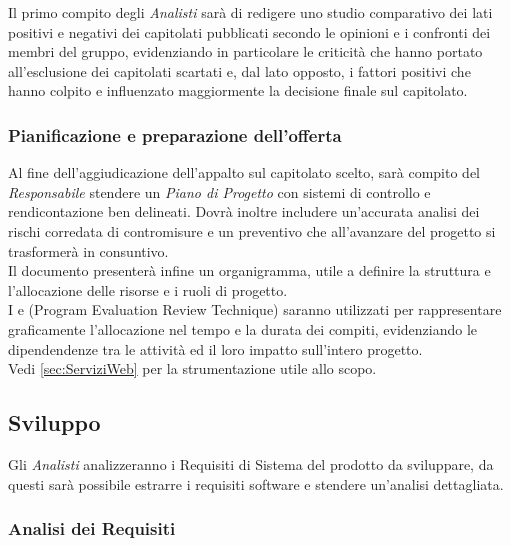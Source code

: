 \documentclass{scalatekids-article}
\begin{document}
Il primo compito degli \textit{Analisti} sarà di redigere uno studio comparativo
dei lati positivi e negativi dei capitolati pubblicati secondo le opinioni e i
confronti dei membri del gruppo, evidenziando in particolare le criticità che
hanno portato all'esclusione dei capitolati scartati e, dal lato opposto, i
fattori positivi che hanno colpito e influenzato maggiormente la decisione
finale sul capitolato.

\subsubsection{Pianificazione e preparazione dell'offerta}

Al fine dell'aggiudicazione dell'appalto sul capitolato scelto, sarà compito del
\textit{Responsabile} stendere un \textit{Piano di Progetto} con sistemi di
controllo e rendicontazione ben delineati. Dovrà inoltre includere un'accurata
analisi dei rischi corredata di contromisure e un preventivo che all'avanzare
del progetto si trasformerà in consuntivo.\\
Il documento presenterà infine un organigramma, utile a definire la struttura
e l'allocazione delle risorse e i ruoli di progetto.\\
I  e  (Program Evaluation Review
Technique) saranno utilizzati per rappresentare graficamente l'allocazione nel
tempo e la durata dei compiti, evidenziando le dipendendenze tra le attività ed
il loro impatto sull'intero progetto.\\
Vedi \ref{sec:ServiziWeb} per la strumentazione utile allo scopo.

\subsection{Sviluppo}

Gli \textit{Analisti} analizzeranno i Requisiti di Sistema del prodotto da
sviluppare, da questi sarà possibile estrarre i requisiti software e stendere un'analisi dettagliata.

\subsubsection{Analisi dei Requisiti}
\end{document}
